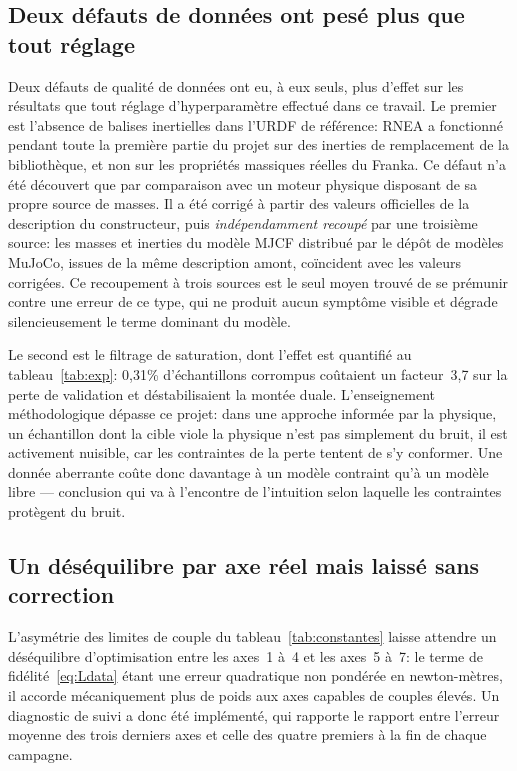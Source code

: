 \documentclass[a4paper, oneside]{article}
\begin{document}
\subsection{Deux défauts de données ont pesé plus que tout réglage}
\label{sec:disc-urdf}

Deux défauts de qualité de données ont eu, à eux seuls, plus d'effet sur les
résultats que tout réglage d'hyperparamètre effectué dans ce travail. Le premier
est l'absence de balises inertielles dans l'URDF de référence: RNEA a
fonctionné pendant toute la première partie du projet sur des inerties de
remplacement de la bibliothèque, et non sur les propriétés massiques réelles du
Franka. Ce défaut n'a été découvert que par comparaison avec un moteur physique
disposant de sa propre source de masses. Il a été corrigé à partir des valeurs
officielles de la description du constructeur, puis \emph{indépendamment
recoupé} par une troisième source: les masses et inerties du modèle MJCF
distribué par le dépôt de modèles MuJoCo, issues de la même description amont,
coïncident avec les valeurs corrigées. Ce recoupement à trois sources est le
seul moyen trouvé de se prémunir contre une erreur de ce type, qui ne produit
aucun symptôme visible et dégrade silencieusement le terme dominant du modèle.

Le second est le filtrage de saturation, dont l'effet est quantifié au
tableau~\ref{tab:exp}: 0{,}31\% d'échantillons corrompus coûtaient un
facteur~3{,}7 sur la perte de validation et déstabilisaient la montée duale.
L'enseignement méthodologique dépasse ce projet: dans une approche informée par
la physique, un échantillon dont la cible viole la physique n'est pas simplement
du bruit, il est activement nuisible, car les contraintes de la perte tentent de
s'y conformer. Une donnée aberrante coûte donc davantage à un modèle contraint
qu'à un modèle libre — conclusion qui va à l'encontre de l'intuition selon
laquelle les contraintes protègent du bruit.

\subsection{Un déséquilibre par axe réel mais laissé sans correction}
\label{sec:res-desequilibre}

L'asymétrie des limites de couple du tableau~\ref{tab:constantes} laisse
attendre un déséquilibre d'optimisation entre les axes~1 à~4 et les axes~5
à~7: le terme de fidélité~\eqref{eq:Ldata} étant une erreur quadratique non
pondérée en newton-mètres, il accorde mécaniquement plus de poids aux axes
capables de couples élevés. Un diagnostic de suivi a donc été implémenté, qui
rapporte le rapport entre l'erreur moyenne des trois derniers axes et celle des
quatre premiers à la fin de chaque campagne.
\end{document}
